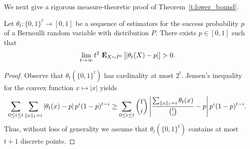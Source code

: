 We next give a rigorous measure-theoretic proof of Theorem~\ref{t:lower_bound}.
\begin{theorem}
  Let $\theta_t: \{0,1\}^t \to [0,1]$ be a sequence of estimators for
  the success probability $p$ of a Bernoulli random variable with
  distribution $P$.
  There exists $p \in [0,1]$ such that
  \[
   \lim_{t\to \infty} t^2\ \Expnew{X \sim P^t}{\lp| \theta_t(X) - p \rp|} > 0.
  \]
\end{theorem}
\begin{proof}
  Observe that $\theta_t(\{0,1\}^t)$ has cardinality at most $2^t$.
  Jensen's inequality for the convex function $x \mapsto |x|$ yields
  \[
    \sum_{0 \leq i \leq t} \sum_{\norm{1}{x} = i}
    \lp| \theta_t(x) - p \rp| p^i (1-p)^{t-i}
    \geq
    \sum_{0 \leq i \leq t} \binom{t}{i} \lp|
     \frac{\sum_{\norm{1}{x} = i} \theta_t(x)}{\binom{t}{i}}  - p \rp|
    p^i (1-p)^{t-i}.
  \]
  Thus, without loss of generality we assume that
  $\theta_t(\{0,1\}^t)$ contains at most $t+1$ discrete
  points.


\end{proof}
